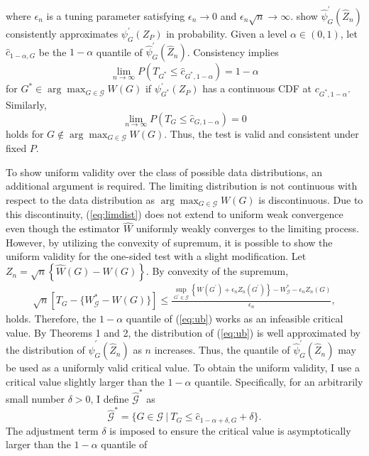\documentclass[12pt,oneside,reqno,english]{amsart}
\theoremstyle{definition}
\begin{document}
where $\epsilon_{n}$ is a tuning parameter satisfying $\epsilon_{n}\rightarrow 0$ and $\epsilon_{n}\sqrt{n}\rightarrow \infty$. 
\cite{HL:18} show $\hat{\psi}^{\prime}_{G}(\hat{Z}_{n})$ consistently approximates $\psi^{\prime}_{G}(Z_{P})$ in probability. 
Given a level $\alpha\in (0,1)$, let $\hat{c}_{1-\alpha,G}$ be the $1-\alpha$ quantile of
$\hat{\psi}^{\prime}_{G}(\hat{Z}_{n})$. 
Consistency implies 
\[\lim_{n\rightarrow \infty} P(T_{G^{*}}\leq \hat{c}_{G^{*},1-\alpha})=1-\alpha\]
for $G^{*}\in \arg\max_{G\in \mathcal{G}}W(G)$ if $\psi^{\prime}_{G^{*}}(Z_{P})$ has a continuous CDF at $c_{G^{*},1-\alpha}$. 
Similarly, 
\[\lim_{n\rightarrow \infty} P(T_{G}\leq \hat{c}_{G,1-\alpha})=0\]
holds for $G\not\in \arg\max_{G\in \mathcal{G}}W(G)$. Thus, the test is valid and consistent under fixed $P$. 

To show uniform validity over the class of possible data distributions, an additional argument is required.   
The limiting distribution is not continuous with respect to the data distribution as $\arg\max_{G\in \mathcal{G}}W(G)$ is discontinuous. 
Due to this discontinuity, (\ref{eq:limdist}) does not extend to uniform weak convergence even though the estimator $\hat{W}$ uniformly weakly converges to the limiting process. However, by utilizing the convexity of supremum, it is possible to show the uniform validity for the one-sided test with a slight modification. 
Let $Z_{n}=\sqrt{n}\left\{\hat{W}(G)-W(G)\right\}$. By convexity of the supremum, 
\begin{align}
\sqrt{n}\left[T_{G}-\{W^{*}_{\mathcal{G}}-W(G)\}\right]\leq \frac{\sup_{G^{\prime}\in \mathcal{G}}\left\{W(G^{\prime})+\epsilon_{n}Z_{n}(G^{\prime})\right\}-W^{*}_{\mathcal{G}}-\epsilon_{n}Z_{n}(G)}{\epsilon_{n}},\label{eq:ub}
\end{align}
holds. Therefore, the $1-\alpha$ quantile of (\ref{eq:ub}) works as an infeasible critical value. 
By Theorems 1 and 2, the distribution of (\ref{eq:ub}) is well approximated by 
the distribution of $\hat{\psi}^{\prime}_{G}(\hat{Z}_{n})$ as $n$ increases.  
Thus, the quantile of $\hat{\psi}^{\prime}_{G}(\hat{Z}_{n})$ may be used as a uniformly valid critical value.
To obtain the uniform validity, I use a critical value slightly larger than the $1-\alpha$ quantile. 
Specifically, for an arbitrarily small number $\delta>0$, I define $\hat{\mathcal{G}}^{*}$ as 
\[\hat{\mathcal{G}}^{*}=\{G\in \mathcal{G}\ | \ T_{G}\leq \hat{c}_{1-\alpha+\delta,G}+\delta\}.\]
The adjustment term $\delta$ is imposed to ensure the critical value is asymptotically larger than the $1-\alpha$ quantile of 
\end{document}
